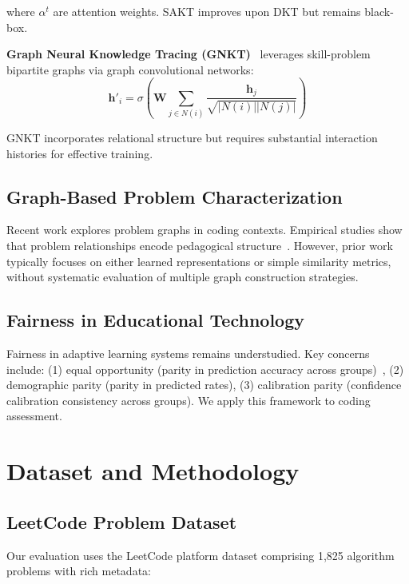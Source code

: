 \documentclass[conference]{IEEEtran}
\begin{document}
where $\alpha^t$ are attention weights. SAKT improves upon DKT but remains black-box.

\textbf{Graph Neural Knowledge Tracing (GNKT)}~\cite{yang2021gikt} leverages skill-problem bipartite graphs via graph convolutional networks:
\begin{equation}
\mathbf{h}'_i = \sigma\left(\mathbf{W} \sum_{j \in N(i)} \frac{\mathbf{h}_j}{\sqrt{|N(i)||N(j)|}}\right)
\end{equation}

GNKT incorporates relational structure but requires substantial interaction histories for effective training.

\subsection{Graph-Based Problem Characterization}

Recent work explores problem graphs in coding contexts. Empirical studies show that problem relationships encode pedagogical structure~\cite{oh2021problem_graphs}. However, prior work typically focuses on either learned representations or simple similarity metrics, without systematic evaluation of multiple graph construction strategies.

\subsection{Fairness in Educational Technology}

Fairness in adaptive learning systems remains understudied. Key concerns include: (1) equal opportunity (parity in prediction accuracy across groups)~\cite{barocas2019}, (2) demographic parity (parity in predicted rates), (3) calibration parity (confidence calibration consistency across groups). We apply this framework to coding assessment.

\section{Dataset and Methodology}

\subsection{LeetCode Problem Dataset}

Our evaluation uses the LeetCode platform dataset comprising 1,825 algorithm problems with rich metadata:
\end{document}
